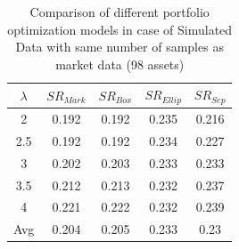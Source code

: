 \begin{table}[!h]
    \centering
    \captionsetup{justification=centering}
   \begin{tabular}{||c|c|c|c|c||}
   \hline
  
  
  $\lambda$ & $SR_{Mark}$ & $SR_{Box}$ & $SR_{Ellip}$ & $SR_{Sep}$ \\
  
  \hline
 2 & 0.192 & 0.192 & 0.235 & 0.216 \\
 2.5 & 0.192 & 0.192 & 0.234 & 0.227 \\
 3 & 0.202 & 0.203 & 0.233 & 0.233 \\
 3.5 & 0.212 & 0.213 & 0.232 & 0.237 \\
 4 & 0.221 & 0.222 & 0.232 & 0.239 \\
  \hline
  Avg & 0.204 & 0.205 & 0.233 & 0.23 \\
  \hline

\end{tabular}
    \caption{Comparison of different portfolio optimization models in case of Simulated Data with same number of samples as market data (98 assets)}
    \label{tab:5}
\end{table}

